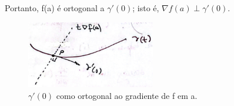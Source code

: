 \documentclass[../analysisII_notes.tex]{subfiles}
\begin{document}
\begin{proof*}
	Portanto, f(a) é ortogonal a \(\gamma '(0)\); isto é, \(\nabla f(a)\perp \gamma '(0)\).
	\begin{figure}[H]
		\begin{center}
			\includegraphics[height=0.5\textheight, width=0.5\textwidth, keepaspectratio]{./Images/orthogonality_25.png}
		\end{center}
		\caption{\(\gamma '(0)\) como ortogonal ao gradiente de f em a.\qedsymbol}
	\end{figure}
\end{proof*}
\end{document}
